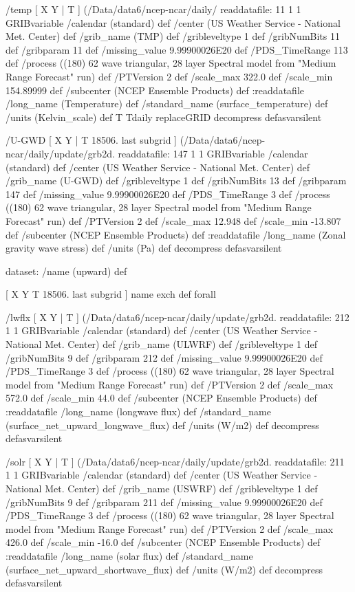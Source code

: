 \begin{ingrid}
  /temp { [ X Y | T ] (/Data/data6/ncep-ncar/daily/%
  readdatafile:
  11 1 1 GRIBvariable
  /calendar (standard) def
  /center (US Weather Service - National Met. Center) def
  /grib_name (TMP) def
  /gribleveltype 1 def
  /gribNumBits 11 def
  /gribparam 11 def
  /missing_value 9.99900026E20 def 
  /PDS_TimeRange 113 def
  /process ((180) 62 wave triangular, 28 layer Spectral model from "Medium Range Forecast" run) def
  /PTVersion 2 def
  /scale_max 322.0 def
  /scale_min 154.89999 def
  /subcenter (NCEP Ensemble Products) def
  :readdatafile
  /long_name (Temperature) def
  /standard_name (surface_temperature) def
  /units (Kelvin_scale) def
  T Tdaily replaceGRID
  decompress
  } defasvarsilent


 /U-GWD { [ X Y | T 18506. last subgrid ] (/Data/data6/ncep-ncar/daily/update/grb2d.%
 readdatafile:
 147 1 1 GRIBvariable
 /calendar (standard) def
 /center (US Weather Service - National Met. Center) def
 /grib_name (U-GWD) def
 /gribleveltype 1 def
 /gribNumBits 13 def
 /gribparam 147 def
 /missing_value 9.99900026E20 def
 /PDS_TimeRange 3 def
  /process ((180) 62 wave triangular, 28 layer Spectral model from "Medium Range Forecast" run) def
 /PTVersion 2 def
 /scale_max 12.948 def
 /scale_min -13.807 def
 /subcenter (NCEP Ensemble Products) def
 :readdatafile
 /long_name (Zonal gravity wave stress) def
 /units (Pa) def
 decompress
 } defasvarsilent
 
  dataset: /name (upward) def

   [ X Y T 18506. last subgrid ] { name exch def } forall

   /lwflx { [ X Y | T ] (/Data/data6/ncep-ncar/daily/update/grb2d.%
   readdatafile:
   212 1 1 GRIBvariable
   /calendar (standard) def
   /center (US Weather Service - National Met. Center) def
   /grib_name (ULWRF) def
   /gribleveltype 1 def
   /gribNumBits 9 def
   /gribparam 212 def
   /missing_value 9.99900026E20 def
   /PDS_TimeRange 3 def
  /process ((180) 62 wave triangular, 28 layer Spectral model from "Medium Range Forecast" run) def
   /PTVersion 2 def
   /scale_max 572.0 def
   /scale_min 44.0 def
   /subcenter (NCEP Ensemble Products) def
   :readdatafile
   /long_name (longwave flux) def
   /standard_name (surface_net_upward_longwave_flux) def
   /units (W/m2) def
   decompress
   } defasvarsilent

   /solr { [ X Y | T ] (/Data/data6/ncep-ncar/daily/update/grb2d.%
   readdatafile:
   211 1 1 GRIBvariable
   /calendar (standard) def
   /center (US Weather Service - National Met. Center) def
   /grib_name (USWRF) def
   /gribleveltype 1 def
   /gribNumBits 9 def
   /gribparam 211 def
   /missing_value 9.99900026E20 def
   /PDS_TimeRange 3 def
  /process ((180) 62 wave triangular, 28 layer Spectral model from "Medium Range Forecast" run) def
   /PTVersion 2 def
   /scale_max 426.0 def
   /scale_min -16.0 def
   /subcenter (NCEP Ensemble Products) def
   :readdatafile
   /long_name (solar flux) def
   /standard_name (surface_net_upward_shortwave_flux) def
   /units (W/m2) def
   decompress
   } defasvarsilent


\end{ingrid}
